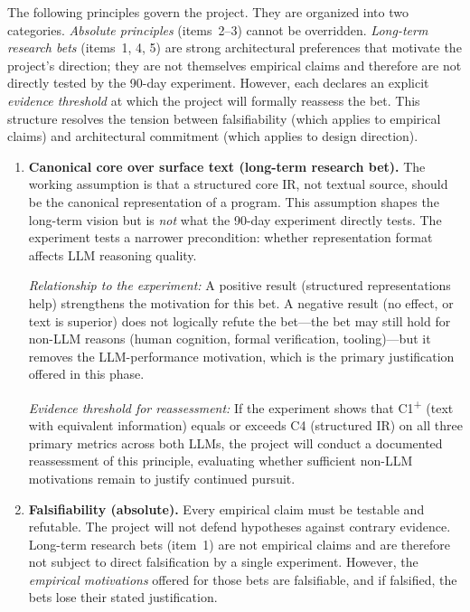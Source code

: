 \documentclass[11pt]{article}
\begin{document}
The following principles govern the project.  They are organized into
two categories.  \emph{Absolute principles} (items~2--3) cannot be
overridden.  \emph{Long-term research bets} (items~1, 4, 5) are
strong architectural preferences that motivate the project's
direction; they are not themselves empirical claims and therefore are
not directly tested by the 90-day experiment.  However, each declares
an explicit \emph{evidence threshold} at which the project will
formally reassess the bet.  This structure resolves the tension
between falsifiability (which applies to empirical claims) and
architectural commitment (which applies to design direction).

\begin{enumerate}
  \item \textbf{Canonical core over surface text (long-term research
        bet).}
        The working assumption is that a structured core IR, not
        textual source, should be the canonical representation of a
        program.  This assumption shapes the long-term vision but is
        \emph{not} what the 90-day experiment directly tests.  The
        experiment tests a narrower precondition: whether
        representation format affects LLM reasoning quality.

        \emph{Relationship to the experiment:}  A positive result
        (structured representations help) strengthens the motivation
        for this bet.  A negative result (no effect, or text is
        superior) does not logically refute the bet---the bet may
        still hold for non-LLM reasons (human cognition, formal
        verification, tooling)---but it removes the LLM-performance
        motivation, which is the primary justification offered in
        this phase.

        \emph{Evidence threshold for reassessment:}  If the
        experiment shows that C1\textsuperscript{+} (text with
        equivalent information) equals or exceeds C4 (structured IR)
        on all three primary metrics across both LLMs, the project
        will conduct a documented reassessment of this principle,
        evaluating whether sufficient non-LLM motivations remain to
        justify continued pursuit.

  \item \textbf{Falsifiability (absolute).}
        Every empirical claim must be testable and refutable.  The
        project will not defend hypotheses against contrary evidence.
        Long-term research bets (item~1) are not empirical claims
        and are therefore not subject to direct falsification by a
        single experiment.  However, the \emph{empirical motivations}
        offered for those bets are falsifiable, and if falsified, the
        bets lose their stated justification.


\end{enumerate}
\end{document}

